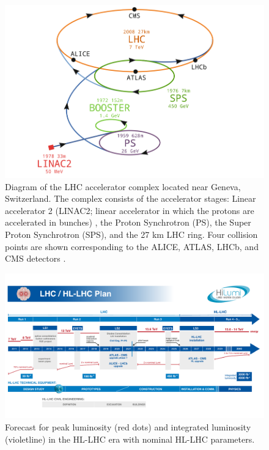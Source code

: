 \documentclass[final,12pt]{article}
\begin{document}
\begin{figure}[H]
  \centering
  \includegraphics[width=0.7\columnwidth]{./LHC-cpx-book.png}
  \caption{Diagram of the LHC accelerator complex located near Geneva, Switzerland. The complex consists of the accelerator stages: Linear accelerator 2 (LINAC2; linear accelerator in which the protons are accelerated in bunches) , the Proton Synchrotron (PS), the Super Proton Synchrotron (SPS), and the 27 km LHC ring. Four collision points are shown corresponding to the ALICE, ATLAS, LHCb, and CMS detectors \cite{Zinser2018}.} %
  \label{figure5}
\end{figure}


\begin{figure}[H]
  \centering
  \includegraphics[width=0.8\columnwidth]{./HL-LHC_2022.pdf}
  \caption{Forecast for peak luminosity (red dots) and integrated luminosity (violetline) in the HL-LHC era with nominal HL-LHC parameters\cite{BejarAlonso:2749422}.}  %
  \label{figure6}
\end{figure}
\end{document}
